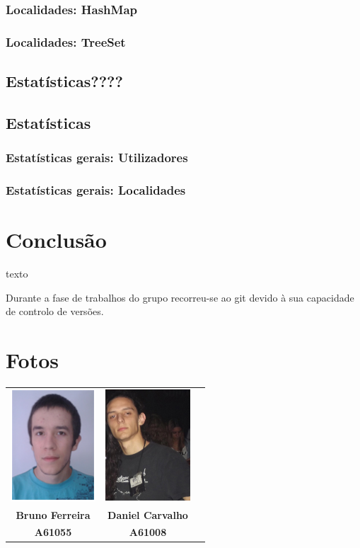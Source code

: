 \documentclass[a5paper,twocolumn, 11pt]{article}
\begin{document}
\subsubsection{Localidades: HashMap}
\subsubsection{Localidades: TreeSet}
\clearpage
\subsection{Estatísticas????}
\clearpage
\subsection{Estatísticas}
\subsubsection{Estatísticas gerais: Utilizadores}
\subsubsection{Estatísticas gerais: Localidades}



\clearpage
\section{Conclusão}
texto

Durante a fase de trabalhos do grupo recorreu-se ao git devido à sua capacidade de controlo de versões.

\clearpage
\onecolumn
\section{Fotos}
\begin{center}
    \begin{tabular}{ccc}
        \includegraphics[width=90pt]{bruno.png}&
        \includegraphics[width=90pt]{daniel.png}\\
        
        \small{\textbf{Bruno Ferreira}}&
        \small{\textbf{Daniel Carvalho}}\\
        \small{\textbf{A61055}}&
        \small{\textbf{A61008}}\\
    \end{tabular}
\end{center}
\end{document}

